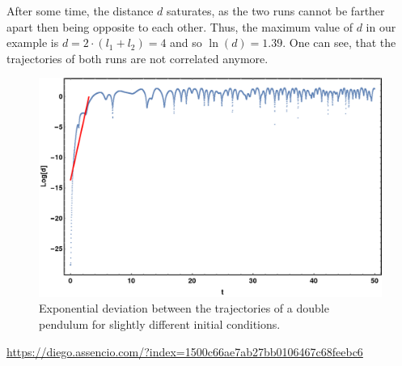 \documentclass{article}
\begin{document}
\indent After some time, the distance $d$ saturates, as the two runs cannot be farther apart then being opposite to each other. Thus, the maximum value of $d$ in our example is $d = 2 \cdot (l_1 + l_2) = 4$ and so $\ln(d) = 1.39$. One can see, that the trajectories of both runs are not correlated anymore.
%
\begin{figure}
	\centering
	\includegraphics[width=0.9\linewidth]{double_pendulum_lyapunov}
	\caption{Exponential deviation between the trajectories of a double pendulum for slightly different initial conditions.}
	\label{fig:doublependulumlyapunov}
\end{figure}
%




\nocite{*}
\printbibliography

\url{https://diego.assencio.com/?index=1500c66ae7ab27bb0106467c68feebc6}
\end{document}
